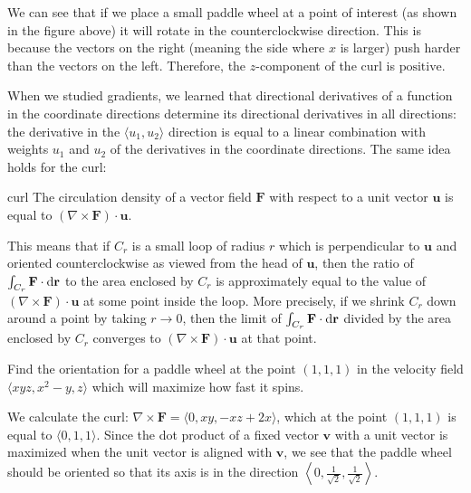 \documentclass{watsonbook}
\begin{document}
\begin{solution}
  We can see that if we place a small paddle wheel at a point of
  interest (as shown in the figure above) it will rotate in the
  counterclockwise direction. This is because the vectors on the right
  (meaning the side where $x$ is larger) push harder than the vectors
  on the left. Therefore, the $z$-component of the curl is
  $\boxed{\text{positive}}$.
\end{solution}

When we studied gradients, we learned that directional derivatives of
a function in the coordinate directions determine its directional
derivatives in all directions: the derivative in the
$\langle u_1, u_2 \rangle$ direction is equal to a linear combination
with weights $u_1$ and $u_2$ of the derivatives in the coordinate
directions. The same idea holds for the curl:
\begin{theo}{}{curl} \bang{-3mm} The circulation density of a vector
  field $\mathbf{F}$ with respect to a unit vector $\mathbf{u} $ is
  equal to $\left(\nabla \times \mathbf{F}\right) \cdot
  \mathbf{u}$.
\end{theo}


This means that if $C_r$ is a small loop of radius $r$ which is
perpendicular to $\mathbf{u}$ and oriented counterclockwise as viewed
from the head of $\mathbf{u}$, then the ratio of
$\int_{C_r} \mathbf{F} \cdot \mathrm{d}\mathbf{r}$ to the area enclosed by
$C_r$ is approximately equal to the value of
$\left(\nabla \times \mathbf{F}\right) \cdot \mathbf{u}$ at some point
inside the loop. More precisely, if we shrink $C_r$ down around a
point by taking $r \to 0$, then the limit of
$\int_{C_r} \mathbf{F} \cdot \mathrm{d}\mathbf{r}$ divided by the area
enclosed by $C_r$ converges to
$\left(\nabla \times \mathbf{F}\right) \cdot \mathbf{u}$ at that
point.
\begin{example}{}{}
  Find the orientation for a paddle wheel at the point $(1,1,1)$ in
  the velocity field $\langle xyz,x^2 - y, z \rangle$ which will
  maximize how fast it spins.
\end{example}

\begin{solution}
  We calculate the curl:
  $\nabla \times \mathbf{F} = \langle 0, xy, -xz + 2x \rangle$, which
  at the point $(1,1,1)$ is equal to $\langle 0,1,1 \rangle$. Since
  the dot product of a fixed vector $\mathbf{v}$ with a unit vector is
  maximized when the unit vector is aligned with $\mathbf{v}$, we see
  that the paddle wheel should be oriented so that its axis is in the
  direction
  $\boxed{\left\langle 0, \tfrac{1}{\sqrt{2}}, \tfrac{1}{\sqrt{2}} \right\rangle}$.
\end{solution}
\end{document}
